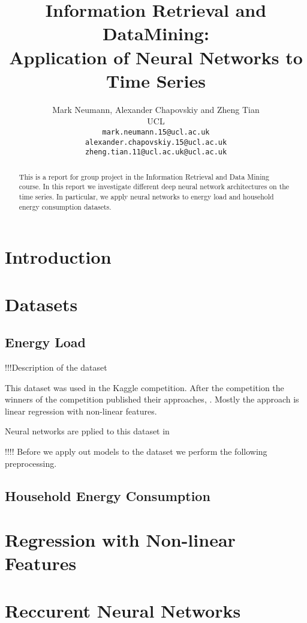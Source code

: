 \documentclass{article} %
\title{Information Retrieval and DataMining:\\
		Application of Neural Networks to Time Series
}
\author{
Mark Neumann, Alexander Chapovskiy and Zheng Tian\\ %
UCL\\
\texttt{mark.neumann.15@ucl.ac.uk} \\
\texttt{alexander.chapovskiy.15@ucl.ac.uk} \\
\texttt{zheng.tian.11@ucl.ac.uk@ucl.ac.uk} \\
}
\begin{document}
\maketitle
\graphicspath{{images/}}

\begin{abstract}
This is a report for group project in the Information Retrieval and Data 
Mining course. In this report we investigate different deep neural network
architectures on the time series. In particular, we apply neural 
networks to energy load and household energy consumption datasets.
\end{abstract}


\section{Introduction}
\label{sec:intro}

\section{Datasets}
\label{sec:data}

\subsection{Energy Load}
\label{sec:data/energy}

!!!Description of the dataset

This dataset was used in the Kaggle competition. After the competition
the winners of the competition published their approaches, 
\cite{energy_kaggle}.
Mostly the approach is linear regression with non-linear features.

Neural networks are pplied to this dataset in \cite{enery_nn}

!!!! Before we apply out models to the dataset we perform the 
following preprocessing.\\

\subsection{Household Energy Consumption}
\label{sec:data/house}

\section{Regression with Non-linear Features}
\label{sec:reg}

\section{Reccurent Neural Networks}
\label{sec:nn}
\end{document}
